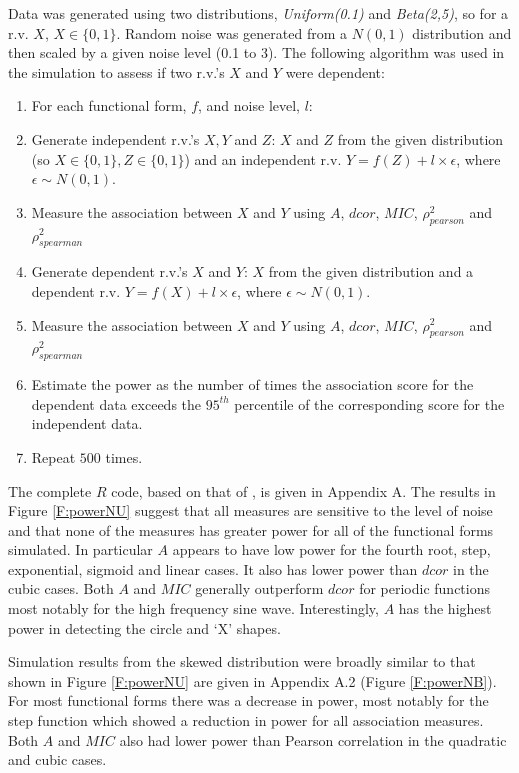 \documentclass[a4paper, 12pt]{report}
\begin{document}
Data was generated using two  distributions, \textit{Uniform(0.1)} and \textit{Beta(2,5)}, so for a  r.v. $X$, $X \in \{0,1\}$. Random noise was generated from a $N(0,1)$ distribution and then scaled by a given noise level (0.1 to 3). The following algorithm was used in the simulation to assess if two r.v.'s $X$ and $Y$ were dependent:

\begin{enumerate}
\item For each functional form, $f$, and noise level, $l$:
\item Generate independent r.v.'s $X,Y$ and $Z$: $X$ and $Z$ from the given distribution (so $X \in \{0,1\}, Z \in \{0,1\}$) and an independent r.v. $Y=f(Z) + l \times \epsilon$, where $\epsilon \sim N(0,1)$.
\item Measure the association between $X$ and $Y$ using $A$, $dcor$, $MIC$, $\rho_{pearson}^2$ and $\rho_{spearman}^2$
\item Generate dependent r.v.'s $X$ and $Y$: $X$ from the given distribution and a dependent r.v. $Y=f(X) + l \times \epsilon$, where $\epsilon \sim N(0,1)$. 
\item Measure the association between $X$ and $Y$ using $A$, $dcor$, $MIC$, $\rho_{pearson}^2$ and $\rho_{spearman}^2$
\item Estimate the power as the number of times the association score for the dependent data exceeds the $95^{th}$ percentile of the corresponding score for the independent data.
\item Repeat $500$ times.
\end{enumerate}

The complete $R$ code, based on that of \citet{Tibshirani2011}, is given in Appendix A. The results in Figure \ref{F:powerNU} suggest that all measures are sensitive to the level of noise and that none of the measures has greater power for all of the functional forms simulated. In particular $A$ appears to have low power for the fourth root, step, exponential, sigmoid and linear cases. It also has lower power than $dcor$ in the cubic cases. Both $A$ and $MIC$ generally outperform $dcor$ for periodic functions most notably for the high frequency sine wave. Interestingly, $A$ has the highest power in detecting the circle and `X' shapes.

Simulation results from the skewed distribution were broadly similar to that shown in Figure \ref{F:powerNU} are given in Appendix A.2 (Figure \ref{F:powerNB}). For most functional forms there was a decrease in power, most notably for the step function which showed a reduction in power for all association measures. Both $A$ and $MIC$ also had lower power than Pearson correlation in the quadratic and cubic cases.
\end{document}

